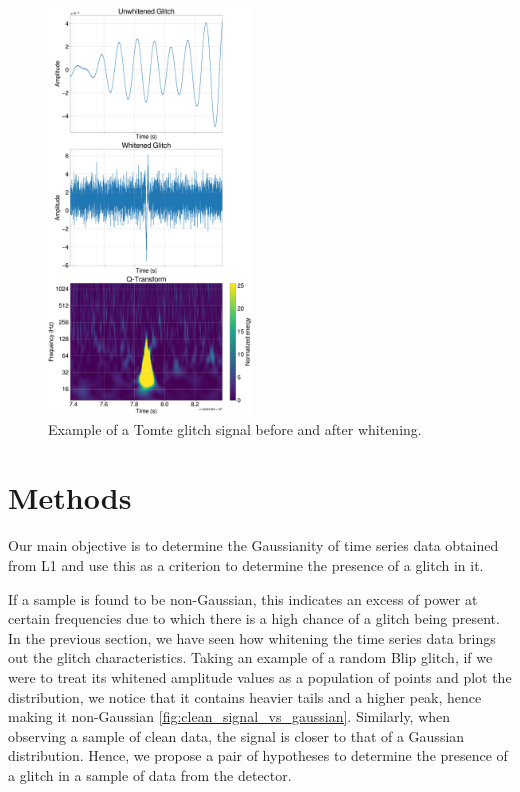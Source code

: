 \documentclass[12pt]{article}
\begin{document}
\begin{figure}[H]
  \centering
  \includegraphics[width=0.48\textwidth]{images/sample_plot.pdf}
  \caption{Example of a Tomte glitch signal before and after whitening.}
  \label{fig:sampletomte}
\end{figure}

\section{Methods}\label{Methods}


Our main objective is to determine the Gaussianity of time series data obtained from L1 and use this as a criterion to determine the presence of a glitch in it. 

\medskip
\noindent If a sample is found to be non-Gaussian, this indicates an excess of power at certain frequencies due to which there is a high chance of a glitch being present. In the previous section, we have seen how whitening the time series data brings out the glitch characteristics. Taking an example of a random Blip glitch, if we were to treat its whitened amplitude values as a population of points and plot the distribution, we notice that it contains heavier tails and a higher peak, hence making it non-Gaussian \ref{fig:clean_signal_vs_gaussian}. Similarly, when observing a sample of clean data, the signal is closer to that of a Gaussian distribution. Hence, we propose a pair of hypotheses to determine the presence of a glitch in a sample of data from the detector.
\end{document}

